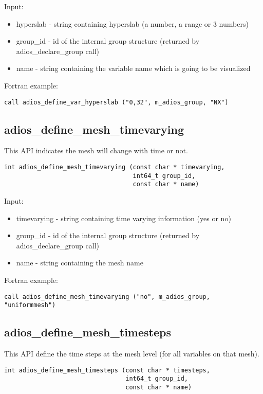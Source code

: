 Input:
\begin{itemize}
\item hyperslab - string containing hyperslab (a number, a range or 3 numbers)
\item group\_id - id of the internal group structure (returned by adios\_declare\_group call)
\item name - string containing the variable name which is going to be visualized
\end{itemize}

Fortran example:
\begin{lstlisting}[alsolanguage=Fortran,caption={},label={}]
call adios_define_var_hyperslab ("0,32", m_adios_group, "NX")
\end{lstlisting}


\subsection{adios\_define\_mesh\_timevarying}
This API indicates the mesh will change with time or not.

\begin{lstlisting}[alsolanguage=C,caption={},label={}]
int adios_define_mesh_timevarying (const char * timevarying, 
                                   int64_t group_id, 
                                   const char * name)
\end{lstlisting}

Input:
\begin{itemize}
\item timevarying - string containing time varying information (yes or no)
\item group\_id - id of the internal group structure (returned by adios\_declare\_group call)
\item name - string containing the mesh name
\end{itemize}

Fortran example:
\begin{lstlisting}[alsolanguage=Fortran,caption={},label={}]
call adios_define_mesh_timevarying ("no", m_adios_group, "uniformmesh")
\end{lstlisting}


\subsection{adios\_define\_mesh\_timesteps}
This API define the time steps at the mesh level (for all variables on that mesh).

\begin{lstlisting}[alsolanguage=C,caption={},label={}]
int adios_define_mesh_timesteps (const char * timesteps, 
                                 int64_t group_id, 
                                 const char * name)
\end{lstlisting}

